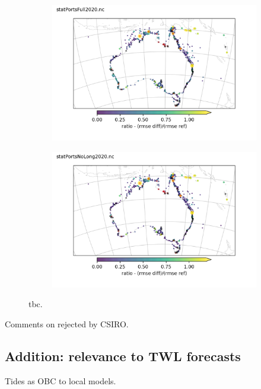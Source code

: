 \begin{figure}[H] \centering
    \begin{subfigure}[b]{0.45\textwidth}
        \includegraphics[width=\textwidth]{figures/maps/portsdiffRmseRatioFull.png}
    \end{subfigure}
    \begin{subfigure}[b]{0.45\textwidth}
        \includegraphics[width=\textwidth]{figures/maps/portsdiffRmseRatioNoLong.png}
    \end{subfigure}
    \caption{ tbc.}
    \label{fig:map_tc}
\end{figure}   
Comments on rejected by CSIRO.

\subsection{Addition: relevance to TWL forecasts}
Tides as OBC to local models.

